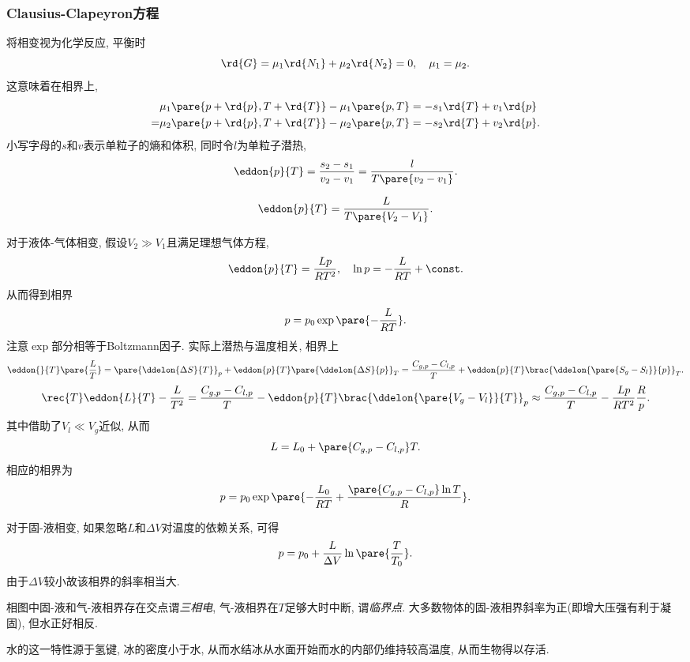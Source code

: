 \documentclass[../Thermal.tex]{subfiles}
\begin{document}
\subsubsection{Clausius-Clapeyron方程}
将相变视为化学反应, 平衡时
\[ \rd{G} = \mu_1\rd{N_1} + \mu_2\rd{N_2} = 0,\quad \mu_1 = \mu_2. \]
这意味着在相界上,
\begin{align*}
& \mu_1\pare{p+\rd{p},T+\rd{T}} - \mu_1\pare{p,T} = -s_1\rd{T} + v_1\rd{p} \\
=& \mu_2\pare{p+\rd{p},T+\rd{T}} - \mu_2\pare{p,T} = -s_2\rd{T} + v_2\rd{p}.
\end{align*}
小写字母的$s$和$v$表示单粒子的熵和体积, 同时令$l$为单粒子潜热,
\[ \eddon{p}{T} = \frac{s_2-s_1}{v_2-v_1} = \frac{l}{T\pare{v_2 - v_1}}. \]
\begin{finale}
\begin{theorem}
\[ \eddon{p}{T} = \frac{L}{T\pare{V_2 - V_1}}. \]
\end{theorem}
\end{finale}
对于液体-气体相变, 假设$V_2\gg V_1$且满足理想气体方程,
\[ \eddon{p}{T} = \frac{Lp}{RT^2},\quad \ln p = -\frac{L}{RT} + \const. \]
从而得到相界
\[ p = p_0 \exp\pare{-\frac{L}{RT}}. \]
注意$\exp$部分相等于Boltzmann因子. 实际上潜热与温度相关, 相界上
\[ \eddon{}{T}\pare{\frac{L}{T}} = \pare{\ddelon{\Delta S}{T}}_p + \eddon{p}{T}\pare{\ddelon{\Delta S}{p}}_T = \frac{C_{g,p} - C_{l,p}}{T} + \eddon{p}{T}\brac{\ddelon{\pare{S_g - S_l}}{p}}_T. \]
\[ \rec{T}\eddon{L}{T} - \frac{L}{T^2} = \frac{C_{g,p} - C_{l,p}}{T} - \eddon{p}{T}\brac{\ddelon{\pare{V_g-V_l}}{T}}_p \approx \frac{C_{g,p} - C_{l,p}}{T} - \frac{Lp}{RT^2}\frac{R}{p}. \]
其中借助了$V_l\ll V_g$近似, 从而
\[ L = L_0 + \pare{C_{g,p} - C_{l,p}} T. \]
相应的相界为
\[ p = p_0\exp\pare{-\frac{L_0}{RT} + \frac{\pare{C_{g,p} - C_{l,p}}\ln T}{R}}. \]
\par
对于固-液相变, 如果忽略$L$和$\Delta V$对温度的依赖关系, 可得
\[ p = p_0 + \frac{L}{\Delta V}\ln\pare{\frac{T}{T_0}}. \]
由于$\Delta V$较小故该相界的斜率相当大. 
\par
相图中固-液和气-液相界存在交点谓\emph{三相电}, 气-液相界在$T$足够大时中断, 谓\emph{临界点}. 大多数物体的固-液相界斜率为正(即增大压强有利于凝固), 但水正好相反.
\begin{remark}
水的这一特性源于氢键, 冰的密度小于水, 从而水结冰从水面开始而水的内部仍维持较高温度, 从而生物得以存活.
\end{remark}
\end{document}
